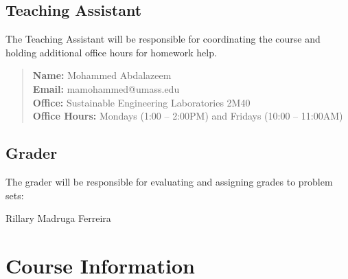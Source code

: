 \documentclass[11pt,twoside]{article}
\numberwithin{equation}{section}
\newcommand{\?}{\stackrel{?}{=}}
\begin{document}
\subsection{Teaching Assistant}
The Teaching Assistant will be responsible for coordinating the course and holding additional office hours for homework help.
\begin{quote}\small
   \textbf{Name:} Mohammed Abdalazeem\\
   \textbf{Email:} mamohammed@umass.edu\\
   \textbf{Office:} Sustainable Engineering Laboratories 2M40\\
   \textbf{Office Hours:} Mondays (1:00 -- 2:00PM) and Fridays (10:00 -- 11:00AM)
   \end{quote}

\subsection{Grader}
The grader  will be responsible for evaluating and assigning grades to problem sets:
\begin{compactitem}\small
	\item Rillary Madruga Ferreira
\end{compactitem} 



\section{Course Information}
\end{document}
